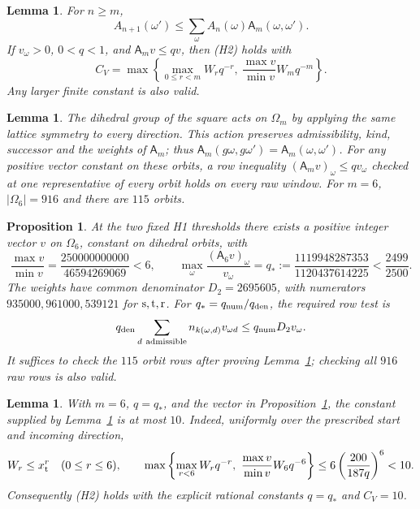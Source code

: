 \documentclass[11pt,reqno]{amsart}
\newtheorem{lemma}[theorem]{Lemma}
\newtheorem{proposition}[theorem]{Proposition}
\theoremstyle{definition}
\theoremstyle{remark}
\begin{document}
\begin{lemma}\label{l:alm}
For \(n\ge m\),
\[
 A_{n+1}(\omega')\le\sum_\omega A_n(\omega)\mathsf A_m(\omega,\omega').
\]
If \(v_\omega>0\), \(0<q<1\), and \(\mathsf A_mv\le qv\),
then (H2) holds with
\[
 C_V=\max\left\{
      \max_{0\le r<m}W_rq^{-r},\
      \frac{\max v}{\min v}W_mq^{-m}\right\}.
\]
Any larger finite constant is also valid.
\end{lemma}

\begin{lemma}\label{l:H2-dihedral}
The dihedral group of the square acts on \(\Omega_m\) by applying
the same lattice symmetry to every direction. This action preserves
admissibility, kind, successor and the weights of \(\mathsf A_m\);
thus \(\mathsf A_m(g\omega,g\omega')=\mathsf A_m(\omega,\omega')\).
For any positive vector constant on these orbits, a row inequality
\((\mathsf A_mv)_\omega\le qv_\omega\) checked at one representative
of every orbit holds on every raw window.
For \(m=6\), \(|\Omega_6|=916\) and there are \(115\) orbits.
\end{lemma}

\begin{proposition}\label{p:H2-test}
At the two fixed H1 thresholds there exists a positive integer
vector \(v\) on \(\Omega_6\), constant on dihedral orbits, with
\[
 \frac{\max v}{\min v}=\frac{250000000000}{46594269069}<6,\qquad
 \max_\omega\frac{(\mathsf A_6v)_\omega}{v_\omega}
       =q_*:=\frac{1119948287353}{1120437614225}<\frac{2499}{2500}.
\]
The weights have common denominator \(D_2=2695605\), with
numerators \(935000,961000,539121\) for \({\rm s},{\rm t},{\rm r}\).
For \(q_*=q_{\rm num}/q_{\rm den}\), the required row test is
\[
 q_{\rm den}\sum_{d\ {\rm admissible}}n_{k(\omega,d)}v_{\omega d}
          \le q_{\rm num}D_2v_\omega .
\]
It suffices to check the \(115\) orbit rows after proving
Lemma~\ref{l:H2-dihedral}; checking all \(916\) raw rows is also valid.
\end{proposition}

\begin{lemma}\label{l:H2-CV}
With \(m=6\), \(q=q_*\), and the vector in Proposition~\ref{p:H2-test},
the constant supplied by Lemma~\ref{l:alm} is at most \(10\).
Indeed, uniformly over the prescribed start and incoming direction,
\[
 W_r\le x_{\rm t}^r\quad(0\le r\le6),\qquad
 \max\left\{\max_{r<6}W_rq^{-r},\
                 \frac{\max v}{\min v}W_6q^{-6}\right\}
 \le6\left(\frac{200}{187q}\right)^6<10.
\]
Consequently (H2) holds with the explicit rational constants
\(q=q_*\) and \(C_V=10\).
\end{lemma}
\end{document}
